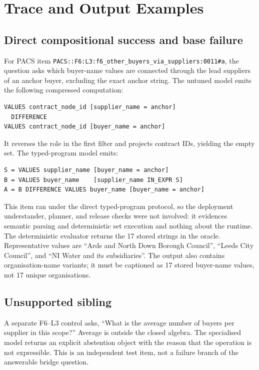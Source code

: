 \section{Trace and Output Examples}
\label{app:examples}

\subsection{Direct compositional success and base failure}

For PACS item \texttt{PACS::F6:L3:f6\_other\_buyers\_via\_suppliers:0011\#a}, the question asks
which buyer-name values are connected through the lead suppliers of an anchor buyer, excluding
the exact anchor string.  The untuned model emits the following compressed computation:
\begin{verbatim}
VALUES contract_node_id [supplier_name = anchor]
  DIFFERENCE
VALUES contract_node_id [buyer_name = anchor]
\end{verbatim}
It reverses the role in the first filter and projects contract IDs, yielding the empty set.  The
typed-program model emits:
\begin{verbatim}
S = VALUES supplier_name [buyer_name = anchor]
B = VALUES buyer_name    [supplier_name IN_EXPR S]
A = B DIFFERENCE VALUES buyer_name [buyer_name = anchor]
\end{verbatim}
This item ran under the direct typed-program protocol, so the deployment understander, planner,
and release checks were not involved: it evidences semantic parsing and deterministic set
execution and nothing about the runtime.  The deterministic evaluator returns the 17 stored
strings in the oracle.  Representative values
are ``Ards and North Down Borough Council'', ``Leeds City Council'', and ``NI Water and its
subsidiaries''.  The output also contains organisation-name variants; it must be captioned as 17
stored buyer-name values, not 17 unique organisations.

\subsection{Unsupported sibling}

A separate F6--L3 control asks, ``What is the average number of buyers per supplier in this
scope?''  Average is outside the closed algebra.  The specialised model returns an explicit
abstention object with the reason that the operation is not expressible.  This is an independent
test item, not a failure branch of the answerable bridge question.

